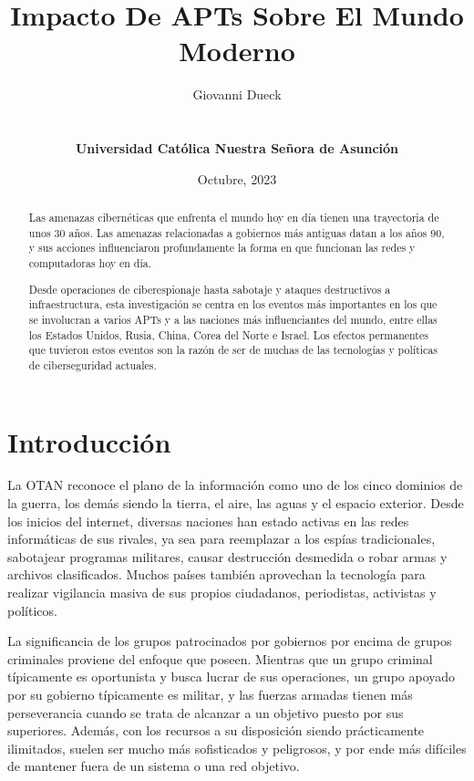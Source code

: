 \documentclass{article}
\title{Impacto De APTs Sobre El Mundo Moderno}
\author{Giovanni Dueck\\\UrlFont{giodueck@gmail.com}\\\\{\bf Universidad Católica Nuestra Señora de Asunción}}
\date{Octubre, 2023}
\begin{document}
\maketitle

\begin{abstract}

Las amenazas cibernéticas que enfrenta el mundo hoy en día tienen una trayectoria de unos 30 años. Las amenazas relacionadas a gobiernos más antiguas datan a los años 90, y sus acciones influenciaron profundamente la forma en que funcionan las redes y computadoras hoy en día.

Desde operaciones de ciberespionaje hasta sabotaje y ataques destructivos a infraestructura, esta investigación se centra en los eventos más importantes en los que se involucran a varios APTs y a las naciones más influenciantes del mundo, entre ellas los Estados Unidos, Rusia, China, Corea del Norte e Israel. Los efectos permanentes que tuvieron estos eventos son la razón de ser de muchas de las tecnologías y políticas de ciberseguridad actuales.

\end{abstract}

\section{Introducción}
La OTAN reconoce el plano de la información como uno de los cinco dominios de la guerra, los demás siendo la tierra, el aire, las aguas y el espacio exterior. Desde los inicios del internet, diversas naciones han estado activas en las redes informáticas de sus rivales, ya sea para reemplazar a los espías tradicionales, sabotajear programas militares, causar destrucción desmedida o robar armas y archivos clasificados. Muchos países también aprovechan la tecnología para realizar vigilancia masiva de sus propios ciudadanos, periodistas, activistas y políticos.

La significancia de los grupos patrocinados por gobiernos por encima de grupos criminales proviene del enfoque que poseen. Mientras que un grupo criminal típicamente es oportunista y busca lucrar de sus operaciones, un grupo apoyado por su gobierno típicamente es militar, y las fuerzas armadas tienen más perseverancia cuando se trata de alcanzar a un objetivo puesto por sus superiores. Además, con los recursos a su disposición siendo prácticamente ilimitados, suelen ser mucho más sofisticados y peligrosos, y por ende más difíciles de mantener fuera de un sistema o una red objetivo.
\end{document}
